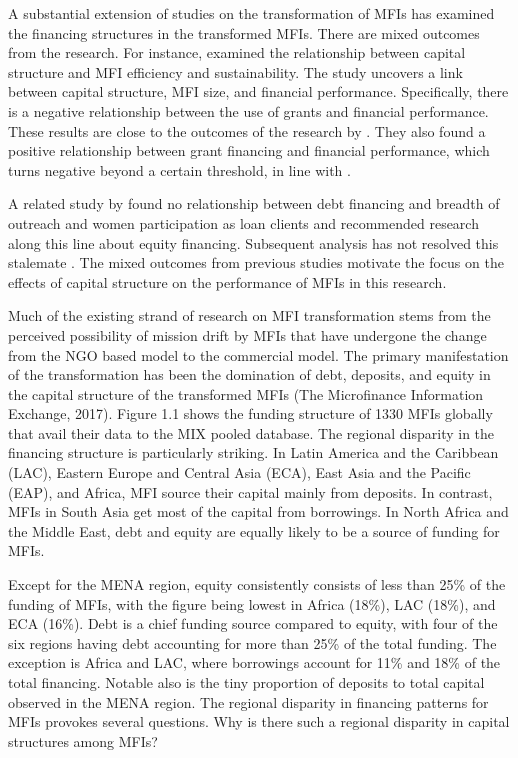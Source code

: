 \documentclass[a4paper, nobind]{templates/ociamthesis}
\begin{document}
A substantial extension of studies on the transformation of MFIs has examined the financing structures in the transformed MFIs. There are mixed outcomes from the research. For instance, \autocite{bogan2012capital} examined the relationship between capital structure and MFI efficiency and sustainability. The study uncovers a link between capital structure, MFI size, and financial performance. Specifically, there is a negative relationship between the use of grants and financial performance. These results are close to the outcomes of the research by \autocite{hudon2011efficiency}. They also found a positive relationship between grant financing and financial performance, which turns negative beyond a certain threshold, in line with \autocite{d2017ngos}.

A related study by \textcite{kar2012does} found no relationship between debt financing and breadth of outreach and women participation as loan clients and recommended research along this line about equity financing. Subsequent analysis has not resolved this stalemate \autocite{hoque2011commercialization,kyereboah2007determinants,khachatryan2017performance,d2017ngos}. The mixed outcomes from previous studies motivate the focus on the effects of capital structure on the performance of MFIs in this research.

Much of the existing strand of research on MFI transformation stems from the perceived possibility of mission drift by MFIs that have undergone the change from the NGO based model to the commercial model. The primary manifestation of the transformation has been the domination of debt, deposits, and equity in the capital structure of the transformed MFIs (The Microfinance Information Exchange, 2017). Figure 1.1 shows the funding structure of 1330 MFIs globally that avail their data to the MIX pooled database. The regional disparity in the financing structure is particularly striking. In Latin America and the Caribbean (LAC), Eastern Europe and Central Asia (ECA), East Asia and the Pacific (EAP), and Africa, MFI source their capital mainly from deposits. In contrast, MFIs in South Asia get most of the capital from borrowings. In North Africa and the Middle East, debt and equity are equally likely to be a source of funding for MFIs.

Except for the MENA region, equity consistently consists of less than 25\% of the funding of MFIs, with the figure being lowest in Africa (18\%), LAC (18\%), and ECA (16\%). Debt is a chief funding source compared to equity, with four of the six regions having debt accounting for more than 25\% of the total funding. The exception is Africa and LAC, where borrowings account for 11\% and 18\% of the total financing. Notable also is the tiny proportion of deposits to total capital observed in the MENA region. The regional disparity in financing patterns for MFIs provokes several questions. Why is there such a regional disparity in capital structures among MFIs?
\end{document}
